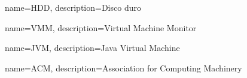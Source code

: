 {
  name=HDD,
  description={Disco duro}
}

{
  name=VMM,
  description={Virtual Machine Monitor}
}

{
  name=JVM,
  description={Java Virtual Machine}
}

{
  name=ACM,
  description={Association for Computing Machinery}
}

